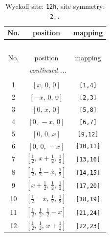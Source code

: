 \documentclass[fleqn,8pt]{jsarticle}
\begin{document}
\begin{longtable}{ccc}
\caption{Wyckoff site: {\tt 12h}, site symmetry: {\tt 2..}}
 \\
 \hline \hline
No. & position & mapping \\ \hline \endfirsthead

\multicolumn{2}{l}{\tablename\ \thetable{}} \\
 \hline \hline
No. & position & mapping \\ \hline \endhead

 \hline \hline
\multicolumn{2}{r}{\footnotesize\it continued ...} \\ \endfoot

 \hline \hline
\multicolumn{2}{r}{} \\ \endlastfoot

1 & $\left[ x,\, 0,\, 0 \right]$ & {\tt [1,4]} \\ \hline
2 & $\left[ - x,\, 0,\, 0 \right]$ & {\tt [2,3]} \\ \hline
3 & $\left[ 0,\, x,\, 0 \right]$ & {\tt [5,8]} \\ \hline
4 & $\left[ 0,\, - x,\, 0 \right]$ & {\tt [6,7]} \\ \hline
5 & $\left[ 0,\, 0,\, x \right]$ & {\tt [9,12]} \\ \hline
6 & $\left[ 0,\, 0,\, - x \right]$ & {\tt [10,11]} \\ \hline
7 & $\left[ \frac{1}{2},\, x + \frac{1}{2},\, \frac{1}{2} \right]$ & {\tt [13,16]} \\ \hline
8 & $\left[ \frac{1}{2},\, \frac{1}{2} - x,\, \frac{1}{2} \right]$ & {\tt [14,15]} \\ \hline
9 & $\left[ x + \frac{1}{2},\, \frac{1}{2},\, \frac{1}{2} \right]$ & {\tt [17,20]} \\ \hline
10 & $\left[ \frac{1}{2} - x,\, \frac{1}{2},\, \frac{1}{2} \right]$ & {\tt [18,19]} \\ \hline
11 & $\left[ \frac{1}{2},\, \frac{1}{2},\, \frac{1}{2} - x \right]$ & {\tt [21,24]} \\ \hline
12 & $\left[ \frac{1}{2},\, \frac{1}{2},\, x + \frac{1}{2} \right]$ & {\tt [22,23]} \\
\end{longtable}
\renewcommand{\arraystretch}{1.2}
\end{document}

